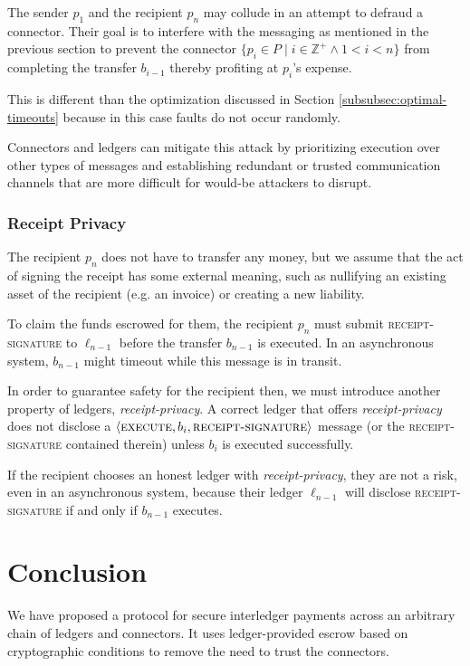 \documentclass[letterpaper,twocolumn,10pt]{article}
\begin{document}
The sender $p_1$ and the recipient $p_n$ may collude in an attempt to defraud a connector. Their goal is to interfere with the messaging as mentioned in the previous section to prevent the connector $ \{ p_i \in P \mid i \in \mathbb{Z}^+ \land 1 < i < n \} $ from completing the transfer $b_{i-1}$ thereby profiting at $p_i$'s expense.

This is different than the optimization discussed in Section \ref{subsubsec:optimal-timeouts} because in this case faults do not occur randomly.

Connectors and ledgers can mitigate this attack by prioritizing execution over other types of messages and establishing redundant or trusted communication channels that are more difficult for would-be attackers to disrupt.

\subsubsection{Receipt Privacy}

The recipient $p_n$ does not have to transfer any money, but we assume that the act of signing the receipt has some external meaning, such as nullifying an existing asset of the recipient (e.g. an invoice) or creating a new liability.

To claim the funds escrowed for them, the recipient $p_n$ must submit \textsc{receipt-signature} to $\ell_{n-1}$ before the transfer $b_{n-1}$ is executed. In an asynchronous system, $b_{n-1}$ might timeout while this message is in transit.

In order to guarantee safety for the recipient then, we must introduce another property of ledgers, \textit{receipt-privacy}. A correct ledger that offers \textit{receipt-privacy} does not disclose a $\langle\textsc{execute}, b_i, \textsc{receipt-signature}\rangle$ message (or the \textsc{receipt-signature} contained therein) unless $b_i$ is executed successfully.

If the recipient chooses an honest ledger with \textit{receipt-privacy}, they are not a risk, even in an asynchronous system, because their ledger $\ell_{n-1}$ will disclose \textsc{receipt-signature} if and only if $b_{n-1}$ executes.


\section{Conclusion}

We have proposed a protocol for secure interledger payments across an arbitrary chain of ledgers and connectors. It uses ledger-provided escrow based on cryptographic conditions to remove the need to trust the connectors.
\end{document}
